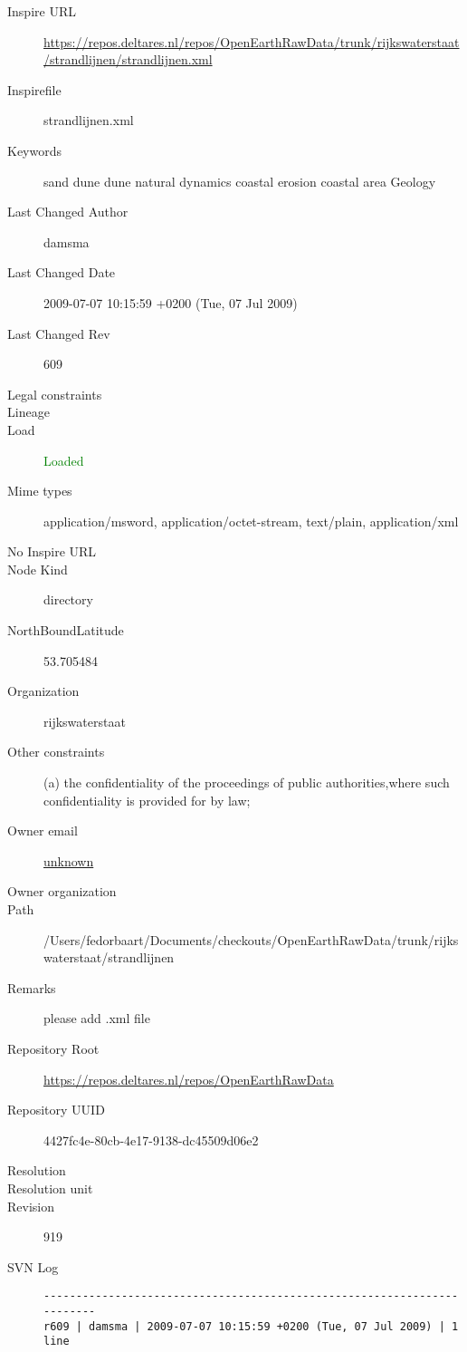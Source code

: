 \documentclass[9]{report}
\begin{document}
\begin{description}
  \item[Inspire URL] \href{https://repos.deltares.nl/repos/OpenEarthRawData/trunk/rijkswaterstaat/strandlijnen/strandlijnen.xml}{https://repos.deltares.nl/repos/OpenEarthRawData/trunk/rijkswaterstaat/strandlijnen/strandlijnen.xml}
  \item[Inspirefile] strandlijnen.xml
  \item[Keywords] sand dune dune natural dynamics coastal erosion coastal area Geology
  \item[Last Changed Author] damsma
  \item[Last Changed Date] 2009-07-07 10:15:59 +0200 (Tue, 07 Jul 2009)
  \item[Last Changed Rev] 609
  \item[Legal constraints] 
  \item[Lineage] 
  \item[Load] \textcolor{green}{Loaded}
  \item[Mime types] application/msword, application/octet-stream, text/plain, application/xml
  \item[No Inspire URL] 
  \item[Node Kind] directory
  \item[NorthBoundLatitude] 53.705484
  \item[Organization] rijkswaterstaat
  \item[Other constraints] (a) the confidentiality of the proceedings of public authorities,where such confidentiality is provided for by law;
  \item[Owner email] \href{mailto:unknown}{unknown}
  \item[Owner organization] 
  \item[Path] /Users/fedorbaart/Documents/checkouts/OpenEarthRawData/trunk/rijkswaterstaat/strandlijnen
  \item[Remarks] please add .xml file
  \item[Repository Root] \href{https://repos.deltares.nl/repos/OpenEarthRawData}{https://repos.deltares.nl/repos/OpenEarthRawData}
  \item[Repository UUID] 4427fc4e-80cb-4e17-9138-dc45509d06e2
  \item[Resolution] 
  \item[Resolution unit] 
  \item[Revision] 919
  \item[SVN Log] \begin{verbatim}
------------------------------------------------------------------------
r609 | damsma | 2009-07-07 10:15:59 +0200 (Tue, 07 Jul 2009) | 1 line


\end{verbatim}
\end{description}
\end{document}
